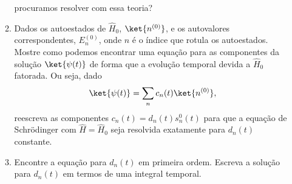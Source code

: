 \begin{enumerate}
\begin{enumerate}
		            procuramos resolver com essa teoria?
		      \item Dados os autoestados de $\hat{H}_0$, $\ket{n^{(0)}}$, e os autovalores
		            correspondentes, $E_n^{(0)}$, onde $n$ é o índice que rotula os
		            autoestados. Mostre como podemos encontrar uma equação para as
		            componentes da solução $\ket{\psi(t)}$ de forma que a evolução
		            temporal devida a $\hat{H}_0$ fatorada. Ou seja, dado
		            $$\ket{\psi(t)} = \sum_n c_n(t)\ket{n^{(0)}},$$ reescreva as
		            componentes $c_n(t) = d_n(t)s^0_n(t)$ para que a equação de
		            Schrödinger com $\hat{H} = \hat{H}_0$ seja resolvida exatamente para
		            $d_n(t)$ constante.
		      \item Encontre a equação para $d_n(t)$ em primeira ordem. Escreva a
		            solução para $d_n(t)$ em termos de uma integral temporal.
	      \end{enumerate}
\end{enumerate}


